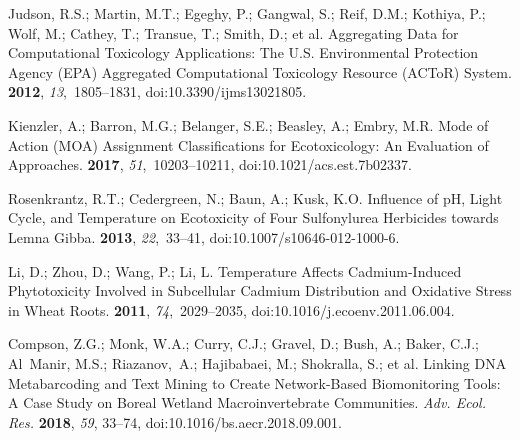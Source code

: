 \documentclass[data,datadescriptor,accept,moreauthors,pdftex]{Definitions/mdpi}
\begin{document}
\begin{thebibliography}{999}
Judson, R.S.; Martin, M.T.; Egeghy, P.; Gangwal, S.; Reif, D.M.; Kothiya, P.;
  Wolf, M.; Cathey, T.; Transue, T.; Smith, D.; et al.
\newblock Aggregating {{Data}} for {{Computational Toxicology Applications}}:
  {{The U}}.{{S}}. {{Environmental Protection Agency}} ({{EPA}}) {{Aggregated
  Computational Toxicology Resource}} ({{ACToR}}) {{System}}.
 {\bf 2012}, {\em
  13},~1805--1831, doi:10.3390/ijms13021805.

Kienzler, A.; Barron, M.G.; Belanger, S.E.; Beasley, A.; Embry, M.R.
\newblock Mode of {{Action}} ({{MOA}}) {{Assignment Classifications}} for
  {{Ecotoxicology}}: {{An Evaluation}} of {{Approaches}}.
 {\bf 2017}, {\em
  51},~10203--10211, doi:10.1021/acs.est.7b02337.

Rosenkrantz, R.T.; Cedergreen, N.; Baun, A.; Kusk, K.O.
\newblock Influence of {{pH}}, Light Cycle, and Temperature on Ecotoxicity of
  Four Sulfonylurea Herbicides towards {{Lemna}} Gibba.
 {\bf 2013}, {\em 22},~33--41, doi:10.1007/s10646-012-1000-6.

Li, D.; Zhou, D.; Wang, P.; Li, L.
\newblock Temperature Affects Cadmium-Induced Phytotoxicity Involved in
  Subcellular Cadmium Distribution and Oxidative Stress in Wheat Roots.
 {\bf 2011}, {\em
  74},~2029--2035, doi:10.1016/j.ecoenv.2011.06.004.

Compson, Z.G.; Monk, W.A.; Curry, C.J.; Gravel, D.; Bush, A.; Baker, C.J.;
  Al~Manir, M.S.; Riazanov,~A.; Hajibabaei, M.; Shokralla, S.; et al.
\newblock Linking {{DNA Metabarcoding}} and {{Text Mining}} to {{Create
  Network}}-{{Based Biomonitoring Tools}}: {{A Case Study}} on {{Boreal Wetland
  Macroinvertebrate Communities}}.   {\em Adv.   {{Ecol. Res.}}}   \textbf{2018},  \emph{59},   33--74, doi:10.1016/bs.aecr.2018.09.001.


\end{thebibliography}
\end{document}
